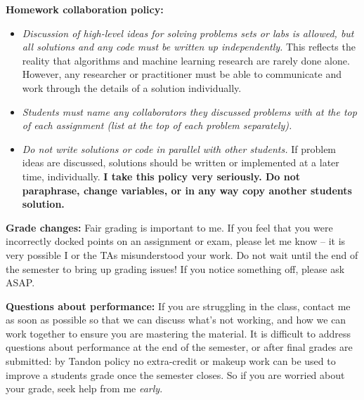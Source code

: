 \documentclass[10pt]{article}
\begin{document}
\medskip\noindent\textbf{Homework collaboration policy:}
\begin{itemize}
	\item \textit{Discussion of high-level ideas for solving problems sets or labs is allowed, but all solutions and any code must be written up independently.} This reflects the reality that algorithms and machine learning research are rarely done alone. However, any researcher or practitioner must be able to communicate and work through the details of a solution individually.
	\item \textit{Students must name any collaborators they discussed problems with at the top of each assignment (list at the top of each problem separately).} 
	\item \textit{Do not write solutions or code in parallel with other students.} If problem ideas are discussed, solutions should be written or implemented at a later time, individually. \textbf{I take this policy very seriously. Do not paraphrase, change variables, or in any way copy another students solution.}
\end{itemize}


\medskip\noindent\textbf{Grade changes:}
 Fair grading is important to me. If you feel that you were incorrectly docked points on an assignment or exam, please let me know -- it is very possible I or the TAs misunderstood your work. Do not wait until the end of the semester to bring up grading issues! If you notice something off, please ask ASAP. 


\medskip\noindent\textbf{Questions about performance:} If you are struggling in the class, contact me as soon as possible so that we can discuss what's not working, and how we can work together to ensure you are mastering the material. It is difficult to address questions about performance at the end of the semester, or after final grades are submitted: by Tandon policy no extra-credit or makeup work can be used to improve a students grade once the semester closes. So if you are worried about your grade, seek help from me \emph{early}.
\end{document}
